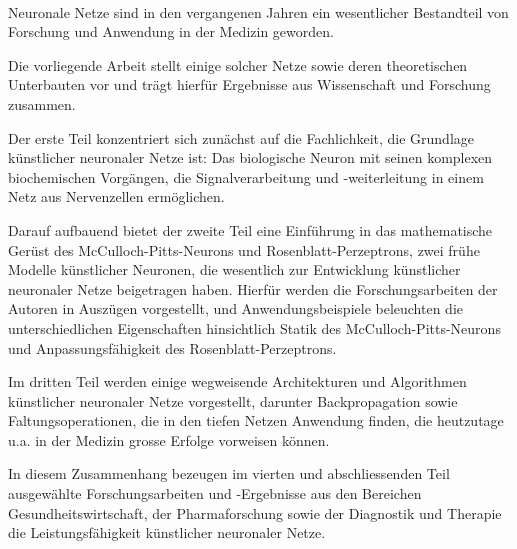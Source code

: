 \kurzfassung

\paragraph*{}

Neuronale Netze sind in den vergangenen Jahren ein wesentlicher Bestandteil von Forschung und Anwendung in der Medizin geworden.

Die vorliegende Arbeit stellt einige solcher Netze sowie deren theoretischen Unterbauten vor und trägt hierfür Ergebnisse aus Wissenschaft und Forschung zusammen.

Der erste Teil konzentriert sich zunächst auf die Fachlichkeit, die Grundlage künstlicher neuronaler Netze ist: Das biologische Neuron mit seinen komplexen biochemischen Vorgängen, die Signalverarbeitung und -weiterleitung in einem Netz aus Nervenzellen ermöglichen.

Darauf aufbauend bietet der zweite Teil eine Einführung in das mathematische Gerüst des McCulloch-Pitts-Neurons und Rosenblatt-Perzeptrons, zwei frühe Modelle künstlicher Neuronen, die wesentlich zur Entwicklung künstlicher neuronaler Netze beigetragen haben.
Hierfür werden die Forschungsarbeiten der Autoren in Auszügen vorgestellt, und Anwendungsbeispiele beleuchten die unterschiedlichen Eigenschaften hinsichtlich Statik des McCulloch-Pitts-Neurons und Anpassungsfähigkeit des Rosenblatt-Perzeptrons.

Im dritten Teil werden einige wegweisende Architekturen und Algorithmen künstlicher neuronaler Netze vorgestellt, darunter Backpropagation sowie Faltungsoperationen, die in den tiefen Netzen Anwendung finden, die heutzutage u.a. in der Medizin grosse Erfolge vorweisen können.

In diesem Zusammenhang bezeugen im vierten und abschliessenden Teil ausgewählte Forschungsarbeiten und -Ergebnisse aus den Bereichen Gesundheitswirtschaft, der Pharmaforschung sowie der Diagnostik und Therapie die Leistungsfähigkeit künstlicher neuronaler Netze.
